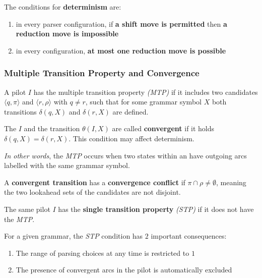 \documentclass[english]{article}
\begin{document}
\bigskip
The conditions for \textbf{determinism} are:

\begin{enumerate}
  \item in every parser configuration, if \textbf{a shift move is permitted} then \textbf{a reduction move is impossible}
  \item in every configuration, \textbf{at most one reduction move is possible}
\end{enumerate}

\subsubsection{Multiple Transition Property and Convergence}
\label{sec:multiple-transition-property-and-convergence}

\begin{definition}
  A pilot \mstate \(I\) has the multiple transition property \textit{(MTP)} if it includes two candidates \(\langle q, \pi \rangle\) and \(\langle r, \rho\rangle\) with \(q \neq r\), such that for some grammar symbol \(X\) both transitions \(\delta(q, X)\) and \(\delta(r, X)\) are defined.
\end{definition}

\begin{definition}
  The \mstate \(I\) and the transition \(\theta(I, X)\) are called \textbf{convergent} if it holds \(\delta(q, X) = \delta(r, X)\).
  This condition may affect determinism.
\end{definition}

\textit{In other words}, the \textit{MTP} occurs when two states within an \mstate have outgoing arcs labelled with the same grammar symbol.

A \textbf{convergent transition} has a \textbf{convergence conflict} if \(\pi \cap \rho \neq \emptyset\), meaning the two lookahead sets of the candidates are not disjoint.

\begin{definition}
  \label{def:single-transition-property}
  The same pilot \mstate \(I\) has the \textbf{single transition property} \textit{(STP)} if it does not have the \textit{MTP}.
\end{definition}

For a given grammar, the \textit{STP} condition has \(2\) important consequences:

\begin{enumerate}
  \item The range of parsing choices at any time is restricted to \(1\)
  \item The presence of convergent arcs in the pilot is automatically excluded
\end{enumerate}
\end{document}

